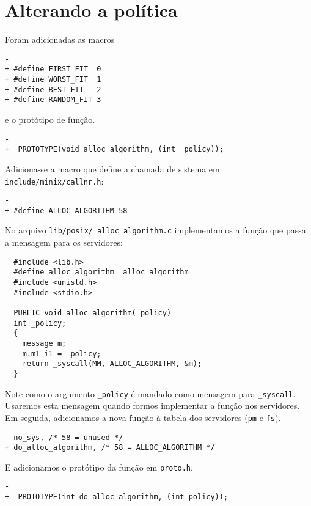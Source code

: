 \documentclass{amsart}
\theoremstyle{plain}
\newcommand{\code}[1]{\lstinline[mathescape=true]{#1}}
\begin{document}
\section{Alterando a política}

Foram adicionadas as macros

\begin{lstlisting}[frame=leftline,mathescape=true,style=nonumbers]
-
+ #define FIRST_FIT  0
+ #define WORST_FIT  1
+ #define BEST_FIT   2
+ #define RANDOM_FIT 3
\end{lstlisting}
e o protótipo de função.
\begin{lstlisting}[frame=leftline,mathescape=true,style=nonumbers]
-
+ _PROTOTYPE(void alloc_algorithm, (int _policy));
\end{lstlisting}

Adiciona-se a macro que define a chamada de sistema em \code{include/minix/callnr.h}:

\begin{lstlisting}[frame=leftline,mathescape=true,style=nonumbers]
-
+ #define ALLOC_ALGORITHM 58
\end{lstlisting}

No arquivo \code{lib/posix/_alloc_algorithm.c} implementamos a função que passa a mensagem para os
servidores:

\begin{verbatim}
  #include <lib.h>
  #define alloc_algorithm _alloc_algorithm
  #include <unistd.h>
  #include <stdio.h>

  PUBLIC void alloc_algorithm(_policy)
  int _policy;
  {
    message m;
    m.m1_i1 = _policy;
    return _syscall(MM, ALLOC_ALGORITHM, &m);
  }
\end{verbatim}

Note como o argumento \code{_policy} é mandado como mensagem para \code{_syscall}. Usaremos esta
mensagem quando formos implementar a função nos servidores. Em seguida, adicionamos a nova função à
tabela dos servidores (\code{pm} e \code{fs}).

\begin{lstlisting}[frame=leftline,mathescape=true,style=nonumbers]
- no_sys, /* 58 = unused */
+ do_alloc_algorithm, /* 58 = ALLOC_ALGORITHM */
\end{lstlisting}

E adicionamos o protótipo da função em \code{proto.h}.

\begin{lstlisting}[frame=leftline,mathescape=true,style=nonumbers]
-
+ _PROTOTYPE(int do_alloc_algorithm, (int policy));
\end{lstlisting}
\end{document}
